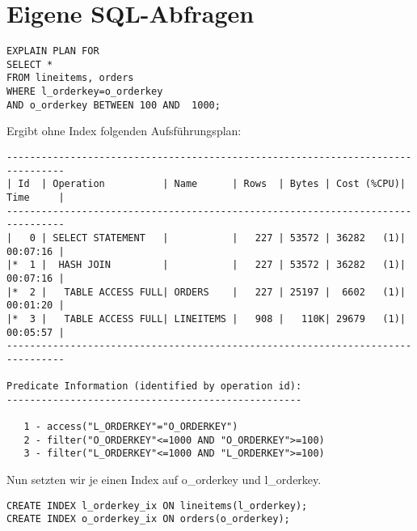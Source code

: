 \documentclass[10pt]{article}
\begin{document}
\section{Eigene SQL-Abfragen}
\begin{lstlisting}[style=sql]
EXPLAIN PLAN FOR
SELECT *
FROM lineitems, orders
WHERE l_orderkey=o_orderkey
AND o_orderkey BETWEEN 100 AND  1000;
\end{lstlisting}
Ergibt ohne Index folgenden Aufsführungsplan:
\begin{lstlisting}[style=queryexecutionplan]
--------------------------------------------------------------------------------
| Id  | Operation          | Name      | Rows  | Bytes | Cost (%CPU)| Time     |
--------------------------------------------------------------------------------
|   0 | SELECT STATEMENT   |           |   227 | 53572 | 36282   (1)| 00:07:16 |
|*  1 |  HASH JOIN         |           |   227 | 53572 | 36282   (1)| 00:07:16 |
|*  2 |   TABLE ACCESS FULL| ORDERS    |   227 | 25197 |  6602   (1)| 00:01:20 |
|*  3 |   TABLE ACCESS FULL| LINEITEMS |   908 |   110K| 29679   (1)| 00:05:57 |
--------------------------------------------------------------------------------
 
Predicate Information (identified by operation id):
---------------------------------------------------
 
   1 - access("L_ORDERKEY"="O_ORDERKEY")
   2 - filter("O_ORDERKEY"<=1000 AND "O_ORDERKEY">=100)
   3 - filter("L_ORDERKEY"<=1000 AND "L_ORDERKEY">=100)
\end{lstlisting}

Nun setzten wir je einen Index auf o\_orderkey und l\_orderkey.

\begin{lstlisting}[style=sql]
CREATE INDEX l_orderkey_ix ON lineitems(l_orderkey);
CREATE INDEX o_orderkey_ix ON orders(o_orderkey);
\end{lstlisting}
\end{document}
